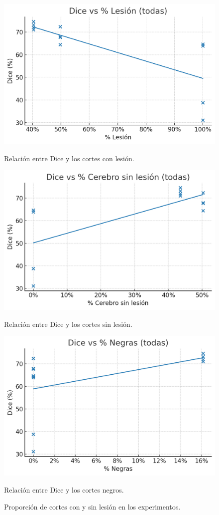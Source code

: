 \documentclass[../main.tex]{subfiles}
\begin{document}
\begin{figure}[!htb]
    \includegraphics[width=\linewidth]{imgs/resultados/corr/dice_vs_lesion.png}
    \caption{Relación entre Dice y los cortes con lesión.}\label{fig:dice_vs_lesion}
\endminipage\hfill
{}
    \includegraphics[width=\linewidth]{imgs/resultados/corr/dice_vs_sin_lesion.png}
    \caption{Relación entre Dice y los cortes sin lesión.}\label{fig:dice_vs_sin_lesion}
\endminipage\hfill
{}%
    \includegraphics[width=\linewidth]{imgs/resultados/corr/dice_vs_negras.png}
    \caption{Relación entre Dice y los cortes negros.}\label{fig:dice_vs_negras}
\endminipage
\caption{Proporción de cortes con y sin lesión en los experimentos.}
\label{fig:proporcion_cortes}
\end{figure}
\end{document}
